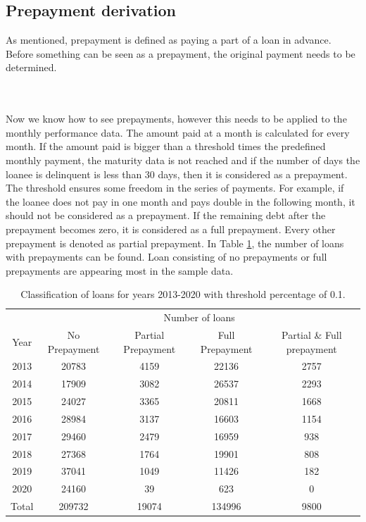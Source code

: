 \subsection{Prepayment derivation}
    As mentioned, prepayment is defined as paying a part of a loan in advance. Before something can be seen as a prepayment, the original payment needs to be determined.
    
    \\\\
    Now we know how to see prepayments, however this needs to be applied to the monthly performance data. The amount paid at a month is calculated for every month. If the amount paid is bigger than a threshold times the predefined monthly payment, the maturity data is not reached and if the number of days the loanee is delinquent is less than 30 days, then it is considered as a prepayment. The threshold ensures some freedom in the series of payments. For example, if the loanee does not pay in one month and pays double in the following month, it should not be considered as a prepayment. If the remaining debt after the prepayment becomes zero, it is considered as a full prepayment. Every other prepayment is denoted as partial prepayment. In Table \ref{model_classficationprepayment_table}, the number of loans with prepayments can be found. Loan consisting of no prepayments or full prepayments are appearing most in the sample data. 
    \begin{table}[H]
    \centering
    \begin{tabular}{c|c|c|c|c}
        & \multicolumn{4}{c}{Number of loans} \\
        Year&No Prepayment&Partial Prepayment&Full Prepayment&Partial \& Full prepayment  \\\hline
        2013 & 20783 & 4159 & 22136 & 2757\\
        2014 & 17909 & 3082 & 26537 & 2293\\
        2015 & 24027 & 3365 & 20811 & 1668 \\
        2016 & 28984 & 3137 & 16603 & 1154 \\
        2017 & 29460 & 2479 & 16959 & 938 \\
        2018 & 27368 & 1764 & 19901 & 808 \\
        2019 & 37041 & 1049 & 11426 & 182 \\
        2020 & 24160 & 39 & 623 & 0 \\\hline
        Total & 209732 & 19074 & 134996 & 9800
		\end{tabular}
		\caption{Classification of loans for years 2013-2020 with threshold percentage of 0.1.}
		\label{model_classficationprepayment_table}
    \end{table}

